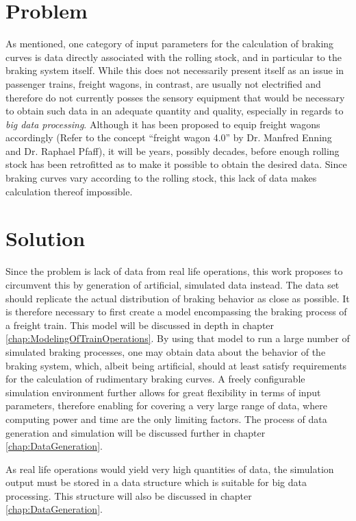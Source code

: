 \section{Problem}
\label{sec:Problem}

\par\noindent
As mentioned, one category of input parameters for the calculation of braking curves is data directly associated with the rolling stock, and in particular to the braking system itself. While this does not necessarily present itself as an issue in passenger trains, freight wagons, in contrast, are usually not electrified and therefore do not currently posses the sensory equipment that would be necessary to obtain such data in an adequate quantity and quality, especially in regards to \textit{big data processing}. Although it has been proposed to equip freight wagons accordingly (Refer to the concept \enquote{freight wagon 4.0} by Dr. Manfred Enning and Dr. Raphael Pfaff), it will be years, possibly decades, before enough rolling stock has been retrofitted as to make it possible to obtain the desired data. Since braking curves vary according to the rolling stock, this lack of data makes calculation thereof impossible.

\section{Solution}
\label{sec:Solution}

\par\noindent
Since the problem is lack of data from real life operations, this work proposes to circumvent this by generation of artificial, simulated data instead. The data set should replicate the actual distribution of braking behavior as close as possible. It is therefore necessary to first create a model encompassing the braking process of a freight train. This model will be discussed in depth in chapter \ref{chap:ModelingOfTrainOperations}. By using that model to run a large number of simulated braking processes, one may obtain data about the behavior of the braking system, which, albeit being artificial, should at least satisfy requirements for the calculation of rudimentary braking curves. A freely configurable simulation environment further allows for great flexibility in terms of input parameters, therefore enabling for covering a very large range of data, where computing power and time are the only limiting factors. The process of data generation and simulation will be discussed further in chapter \ref{chap:DataGeneration}.
\par
As real life operations would yield very high quantities of data, the simulation output must be stored in a data structure which is suitable for big data processing. This structure will also be discussed in chapter \ref{chap:DataGeneration}.